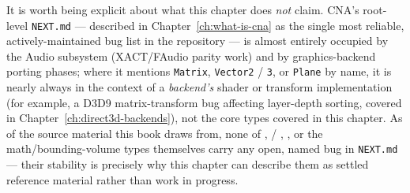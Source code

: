 It is worth being explicit about what this chapter does \emph{not} claim. CNA's root-level
\texttt{NEXT.md} --- described in Chapter~\ref{ch:what-is-cna} as the single most reliable,
actively-maintained bug list in the repository --- is almost entirely occupied by the Audio
subsystem (XACT/FAudio parity work) and by graphics-backend porting phases; where it mentions
\texttt{Matrix}, \texttt{Vector2} / \texttt{3}, or \texttt{Plane} by name, it is nearly always in
the context of a \emph{backend's} shader or transform implementation (for example, a D3D9
matrix-transform bug affecting  layer-depth sorting, covered in
Chapter~\ref{ch:direct3d-backends}), not the core  types
covered in this chapter. As of the source material this book draws from, none of
,  / , , or the
math/bounding-volume types themselves carry any open, named bug in \texttt{NEXT.md} --- their
stability is precisely why this chapter can describe them as settled reference material rather
than work in progress.
